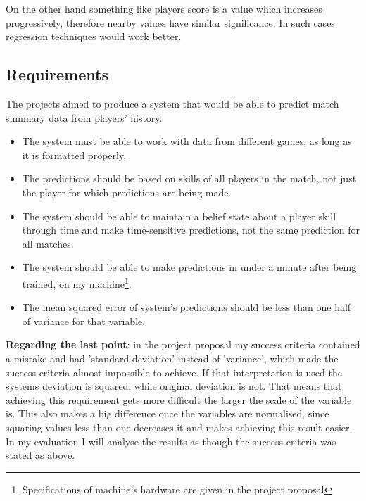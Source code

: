 \documentclass[12pt,a4paper]{book}
\begin{document}
On the other hand something like players score is a value which increases progressively, therefore nearby values have similar significance.
In such cases regression techniques would work better.
\subsection{Requirements}
The projects aimed to produce a system that would be able to predict match summary data from players' history.
\begin{itemize}
\item The system must be able to work with data from different games, as long as it is formatted properly.
\item The predictions should be based on skills of all players in the match, not just the player for which predictions are being made.
\item The system should be able to maintain a belief state about a player skill through time and make time-sensitive predictions, not the same prediction for all matches.
\item The system should be able to make predictions in under a minute after being trained, on my machine\footnote{Specifications of machine's hardware are given in the project proposal}.
\item The mean squared error of system's predictions should be less than one half of variance for that variable.
\end{itemize}
\label{requirements-error}
\textbf{Regarding the last point}: in the project proposal my success criteria contained a mistake and had 'standard deviation' instead of 'variance', which made the success criteria almost impossible to achieve.
If that interpretation is used the systems deviation is squared, while original deviation is not.
That means that achieving this requirement gets more difficult the larger the scale of the variable is.
This also makes a big difference once the variables are normalised, since squaring values less than one decreases it and makes achieving this result easier.
In my evaluation I will analyse the results as though the success criteria was stated as above.
\end{document}

